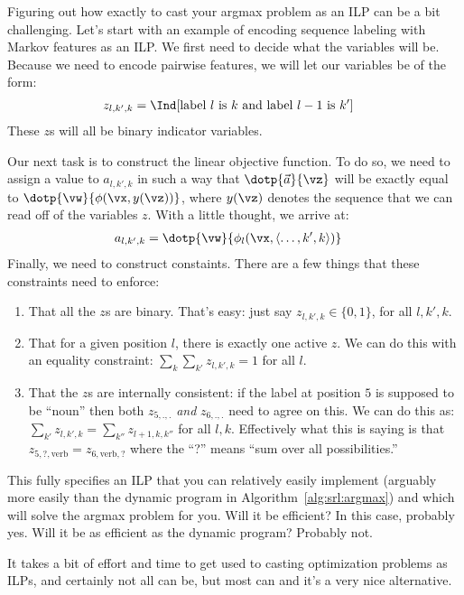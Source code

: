 Figuring out how exactly to cast your argmax problem as an ILP can be a bit challenging.
Let's start with an example of encoding sequence labeling with Markov features as an ILP.
We first need to decide what the variables will be.
Because we need to encode pairwise features, we will let our variables be of the form:
\begin{align}
z_{l,k',k} &= \Ind[\text{label $l$ is $k$ and label $l-1$ is $k'$}]
\end{align}
These $z$s will all be binary indicator variables.

Our next task is to construct the linear objective function.
To do so, we need to assign a value to $a_{l,k',k}$ in such a way that $\dotp{\vec a}{\vz}$ will be exactly equal to $\dotp{\vw}{\phi(\vx,y(\vz))}$, where $y(\vz)$ denotes the sequence that we can read off of the variables $z$.
With a little thought, we arrive at:
\begin{align}
a_{l,k',k} &= \dotp{\vw}{\phi_l(\vx, \langle \dots, k', k\rangle)}
\end{align}
Finally, we need to construct constaints.
There are a few things that these constraints need to enforce:
\begin{enumerate}
\item That all the $z$s are binary. That's easy: just say $z_{l,k',k} \in \{0,1\}$, for all $l,k',k$.
\item That for a given position $l$, there is exactly one active $z$. We can do this with an equality constraint: $\sum_k \sum_{k'} z_{l,k',k} = 1$ for all $l$.
\item That the $z$s are internally consistent: if the label at position $5$ is supposed to be ``noun'' then both $z_{5,.,.}$ \emph{and} $z_{6,.,.}$ need to agree on this. We can do this as: $\sum_{k'} z_{l,k',k} = \sum_{k''} z_{l+1,k,k''}$ for all $l,k$. Effectively what this is saying is that $z_{5,?,\text{verb}} = z_{6,\text{verb},?}$ where the ``?'' means ``sum over all possibilities.''
\end{enumerate}

This fully specifies an ILP that you can relatively easily implement (arguably more easily than the dynamic program in Algorithm~\ref{alg:srl:argmax}) and which will solve the argmax problem for you.
Will it be efficient?
In this case, probably yes.
Will it be as efficient as the dynamic program?
Probably not.

It takes a bit of effort and time to get used to casting optimization problems as ILPs, and certainly not all can be, but most can and it's a very nice alternative.

